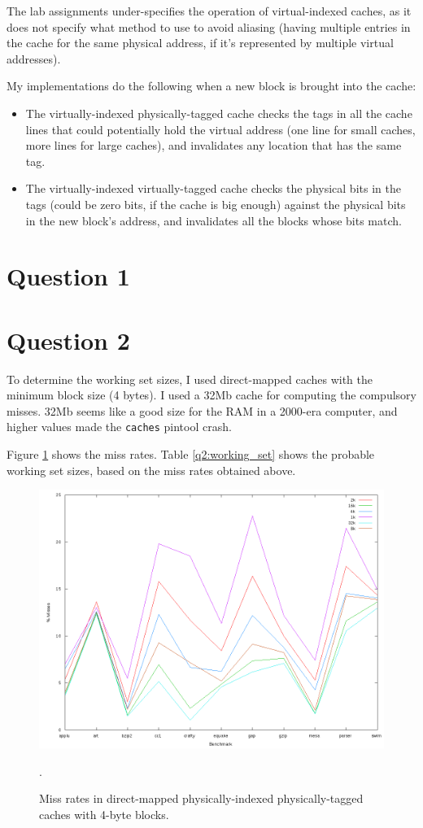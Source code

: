The lab assignments under-specifies the operation of virtual-indexed caches, as
it does not specify what method to use to avoid aliasing (having multiple
entries in the cache for the same physical address, if it's represented by
multiple virtual addresses).

My implementations do the following when a new block is brought into the cache:
\begin{itemize}
  \item The virtually-indexed physically-tagged cache checks the tags in all
  the cache lines that could potentially hold the virtual address (one line for
  small caches, more lines for large caches), and invalidates any location that
  has the same tag.
  \item The virtually-indexed virtually-tagged cache checks the physical bits
  in the tags (could be zero bits, if the cache is big enough) against the
  physical bits in the new block's address, and invalidates all the blocks
  whose bits match.
\end{itemize}

\section{Question 1}

\section{Question 2}

To determine the working set sizes, I used direct-mapped caches with the
minimum block size (4 bytes). I used a 32Mb cache for computing the compulsory
misses. 32Mb seems like a good size for the RAM in a 2000-era computer, and
higher values made the \texttt{caches} pintool crash.

Figure \ref{q2:miss_rates} shows the miss rates. Table \ref{q2:working_set}
shows the probable working set sizes, based on the miss rates obtained above.

\begin{figure}[htb]
  \includegraphics[width=6.8in]{6.823/lab2/figs/working_set.png}
  \caption{Miss rates in direct-mapped physically-indexed physically-tagged
  caches with 4-byte blocks. }
  \label{q2:miss_rates}.
\end{figure}


